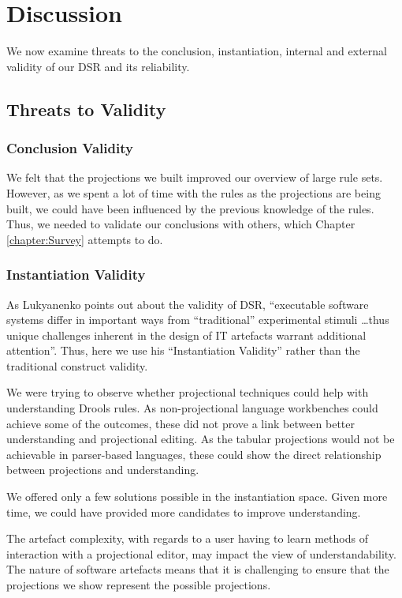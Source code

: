 \section{Discussion}
\label{section:dsr_discussion}

We now examine threats to the conclusion, instantiation, internal and external validity of our DSR and its reliability.

\subsection{Threats to Validity} 

\subsubsection{Conclusion Validity}
We felt that the projections we built improved our overview of large rule sets.
However, as we spent a lot of time with the rules as the projections are being built, we could have been influenced by the previous knowledge of the rules.
Thus, we needed to validate our conclusions with others, which Chapter \ref{chapter:Survey} attempts to do.

\subsubsection{Instantiation Validity}
As Lukyanenko\cite{Lukyanenko_2014} points out about the validity of DSR, ``executable software systems differ in important ways from ``traditional'' experimental stimuli \dots thus unique challenges inherent in the design of IT artefacts warrant additional attention''.
Thus, here we use his ``Instantiation Validity'' rather than the traditional construct validity.

We were trying to observe whether projectional techniques could help with understanding Drools rules. 
As non-projectional language workbenches could achieve some of the outcomes, these did not prove a link between better understanding and projectional editing.
As the tabular projections would not be achievable in parser-based languages, these could show the direct relationship between projections and understanding.

We offered only a few solutions possible in the instantiation space.
Given more time, we could have provided more candidates to improve understanding.

The artefact complexity, with regards to a user having to learn methods of interaction with a projectional editor, may impact the view of understandability.
The nature of software artefacts means that it is challenging to ensure that the projections we show represent the possible projections.

